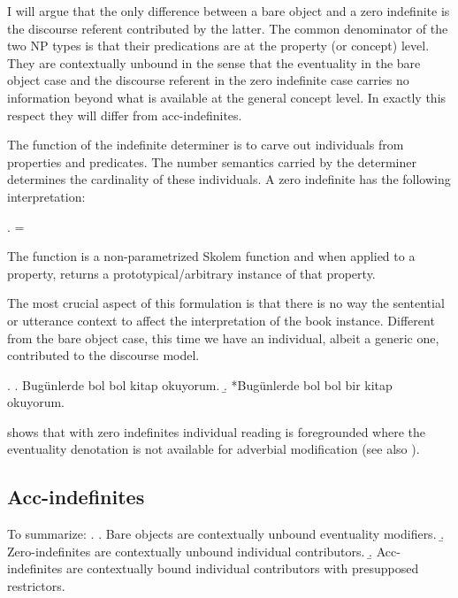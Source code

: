 \documentclass[11pt,a4paper]{article}
\begin{document}
I will argue that the only difference between a bare object and a zero indefinite is the discourse referent contributed by the latter. The common denominator of the two NP types is that their predications are at the property (or concept) level. They are contextually unbound in the sense that the eventuality in the bare object case and the discourse referent in the zero indefinite case carries no information beyond what is available at the general concept level. In exactly this respect they will differ from acc-indefinites.


The function of the indefinite determiner is to carve out individuals from properties and predicates. The number semantics carried by the determiner determines the cardinality of these individuals. A zero indefinite has the following interpretation:

\ex.
 =

The function  is a non-parametrized Skolem function and when applied to a property, returns a prototypical/arbitrary instance of that property.

The most crucial aspect of this formulation is that there is no way the sentential or utterance context to affect the interpretation of the book instance. Different from the bare object case, this time we have an individual, albeit a generic one, contributed to the discourse model.

\ex.\label{exbolbol}
\a. Bugünlerde bol bol kitap okuyorum.
\b. *Bugünlerde bol bol bir kitap okuyorum.

 shows that with zero indefinites individual reading is foregrounded where the eventuality denotation is not available for adverbial modification (see also ).



\subsection{Acc-indefinites}

To summarize:
\ex.
\a. Bare objects are contextually unbound eventuality modifiers.
\b. Zero-indefinites are contextually unbound individual contributors.
\b. Acc-indefinites are contextually bound individual contributors with presupposed restrictors.
\end{document}
